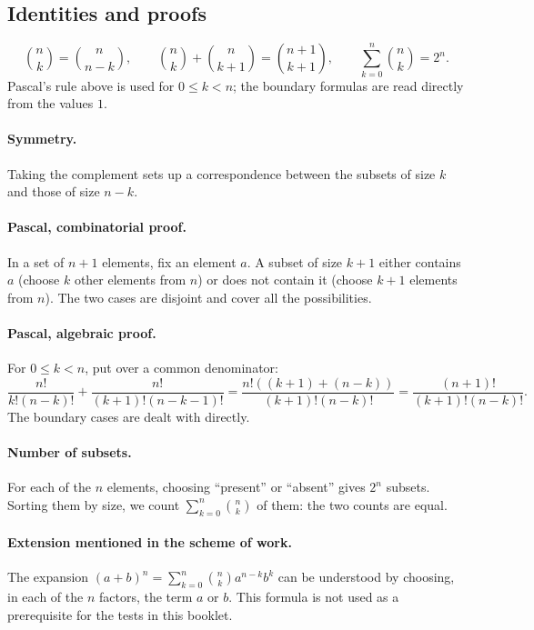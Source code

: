 \subsection{Identities and proofs}
\[\binom nk=\binom n{n-k},\qquad \binom nk+\binom n{k+1}=\binom{n+1}{k+1},\qquad\sum_{k=0}^n\binom nk=2^n.\]
Pascal's rule above is used for $0\le k<n$; the boundary formulas are read directly from the values $1$.
\paragraph{Symmetry.} Taking the complement sets up a correspondence between the subsets of size $k$ and those of size $n-k$.
\paragraph{Pascal, combinatorial proof.} In a set of $n+1$ elements, fix an element $a$. A subset of size $k+1$ either contains $a$ (choose $k$ other elements from $n$) or does not contain it (choose $k+1$ elements from $n$). The two cases are disjoint and cover all the possibilities.
\paragraph{Pascal, algebraic proof.} For $0\le k<n$, put over a common denominator:
\[\frac{n!}{k!(n-k)!}+\frac{n!}{(k+1)!(n-k-1)!}
=\frac{n!((k+1)+(n-k))}{(k+1)!(n-k)!}
=\frac{(n+1)!}{(k+1)!(n-k)!}.\]
The boundary cases are dealt with directly.
\paragraph{Number of subsets.} For each of the $n$ elements, choosing ``present'' or ``absent'' gives $2^n$ subsets. Sorting them by size, we count $\sum_{k=0}^n\binom nk$ of them: the two counts are equal.
\paragraph{Extension mentioned in the scheme of work.} The expansion $(a+b)^n=\sum_{k=0}^n\binom nk a^{n-k}b^k$ can be understood by choosing, in each of the $n$ factors, the term $a$ or $b$. This formula is not used as a prerequisite for the tests in this booklet.


\mxnewpage
